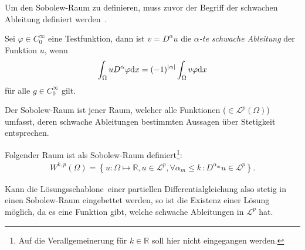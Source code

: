 Um den Sobolew-Raum zu definieren, muss zuvor der Begriff der schwachen Ableitung definiert werden~\cite[nach][S. 13f.]{korobkov_steady_2024}.
\begin{Definitionbox}[]
    Sei $\varphi\in C^{\infty}_0$ eine Testfunktion, dann ist $v=D^{\alpha} u$ die \emph{$\alpha$-te schwache Ableitung} der Funktion $u$, wenn
    \begin{align*}
        \int_{\Omega}{uD^{\alpha}\varphi \text{d}{x}}=(-1)^{|\alpha|} \int_{\Omega}{v\varphi \text{d} x}
    \end{align*}
    für alle $g\in C^{\infty}_0$ gilt.
\end{Definitionbox}
Der Sobolew-Raum ist jener Raum, welcher alle Funktionen ($\in \mathcal{L}^p (\Omega)$) umfasst, deren schwache Ableitungen bestimmten Aussagen über Stetigkeit entsprechen.
\begin{Definitionbox}[]
    Folgender Raum ist als Sobolew-Raum definiert\footnote{Auf die Verallgemeinerung für $k\in \mathbb{R}$ soll hier nicht eingegangen werden.}:
    \begin{align*}
    W^{k,p}(\Omega) = \left\{ u:\Omega \mapsto \mathbb{R}, u \in \mathcal{L}^p , \forall \alpha_m \leq k \,: D^{\alpha_m}u \in \mathcal{L}^p \right\}.
    \end{align*}
\end{Definitionbox}
Kann die \glqq Lösungsschablone\grqq~einer partiellen Differentialgleichung also stetig in einen Sobolew-Raum eingebettet werden, so ist die Existenz einer Lösung möglich, da es eine Funktion gibt, welche schwache Ableitungen in $\mathcal{L}^p$ hat.

